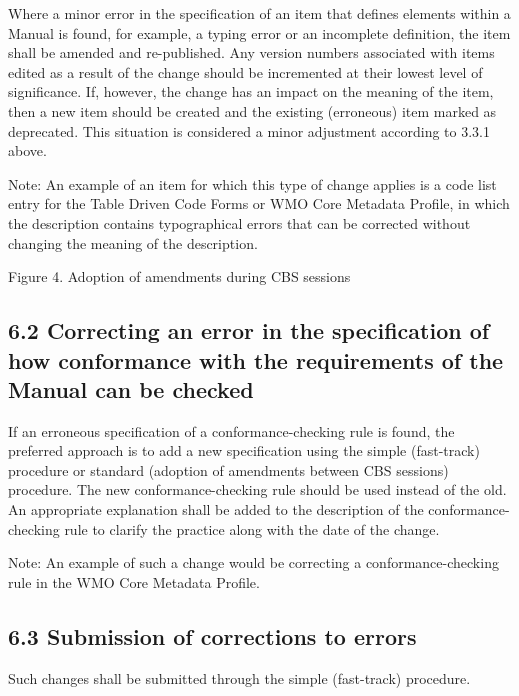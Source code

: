 Where a minor error in the specification of an item that defines elements within a Manual is found, for example, a typing error or an incomplete definition, the item shall be amended and re-published. Any version numbers associated with items edited as a result of the change should be incremented at their lowest level of significance. If, however, the change has an impact on the meaning of the item, then a new item should be created and the existing (erroneous) item marked as deprecated. This situation is considered a minor adjustment according to 3.3.1 above.

Note: An example of an item for which this type of change applies is a code list entry for the Table Driven Code Forms or WMO Core Metadata Profile, in which the description contains typographical errors that can be corrected without changing the meaning of the description.

Figure 4. Adoption of amendments during CBS sessions

\hypertarget{correcting-an-error-in-the-specification-of-how-conformance-with-the-requirements-of-the-manual-can-be-checked}{%
\subsection{6.2 Correcting an error in the specification of how conformance with the requirements of the Manual can be checked}\label{correcting-an-error-in-the-specification-of-how-conformance-with-the-requirements-of-the-manual-can-be-checked}}

If an erroneous specification of a conformance-checking rule is found, the preferred approach is to add a new specification using the simple (fast-track) procedure or standard (adoption of amendments between CBS sessions) procedure. The new conformance-checking rule should be used instead of the old. An appropriate explanation shall be added to the description of the conformance-checking rule to clarify the practice along with the date of the change.

Note: An example of such a change would be correcting a conformance-checking rule in the WMO Core Metadata Profile.

\hypertarget{submission-of-corrections-to-errors}{%
\subsection{6.3 Submission of corrections to errors}\label{submission-of-corrections-to-errors}}

Such changes shall be submitted through the simple (fast-track) procedure.

